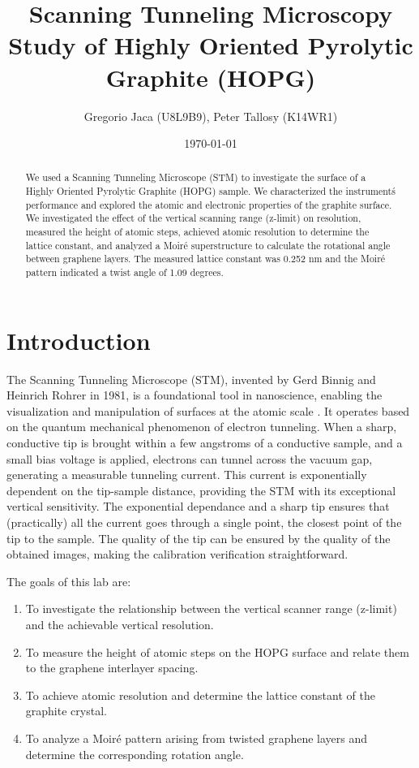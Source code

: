 \documentclass[12pt,a4paper]{article}
\title{Scanning Tunneling Microscopy Study of Highly Oriented Pyrolytic Graphite (HOPG)}
\author{Gregorio Jaca (U8L9B9), Peter Tallosy (K14WR1)}
\date{\today}
\begin{document}
\maketitle

\begin{abstract}
We used a Scanning Tunneling Microscope (STM) to investigate the surface of a Highly Oriented Pyrolytic Graphite (HOPG) sample. We characterized the instrument\'s performance and explored the atomic and electronic properties of the graphite surface. We investigated the effect of the vertical scanning range (z-limit) on resolution, measured the height of atomic steps, achieved atomic resolution to determine the lattice constant, and analyzed a Moiré superstructure to calculate the rotational angle between graphene layers. The measured lattice constant was 0.252 nm and the Moiré pattern indicated a twist angle of 1.09 degrees.

\end{abstract}

\section{Introduction}
The Scanning Tunneling Microscope (STM), invented by Gerd Binnig and Heinrich Rohrer in 1981, is a foundational tool in nanoscience, enabling the visualization and manipulation of surfaces at the atomic scale \cite{stm_manual}. It operates based on the quantum mechanical phenomenon of electron tunneling. When a sharp, conductive tip is brought within a few angstroms of a conductive sample, and a small bias voltage is applied, electrons can tunnel across the vacuum gap, generating a measurable tunneling current. This current is exponentially dependent on the tip-sample distance, providing the STM with its exceptional vertical sensitivity. The exponential dependance and a sharp tip ensures that (practically) all the current goes through a single point, the closest point of the tip to the sample. The quality of the tip can be ensured by the quality of the obtained images, making the calibration verification straightforward.

The goals of this lab are:
\begin{enumerate}
    \item To investigate the relationship between the vertical scanner range (z-limit) and the achievable vertical resolution.
    \item To measure the height of atomic steps on the HOPG surface and relate them to the graphene interlayer spacing.
    \item To achieve atomic resolution and determine the lattice constant of the graphite crystal.
    \item To analyze a Moiré pattern arising from twisted graphene layers and determine the corresponding rotation angle.
\end{enumerate}
\end{document}
